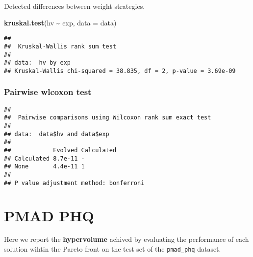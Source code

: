 \documentclass[
]{book}
\newenvironment{Shaded}{\begin{snugshade}}{\end{snugshade}}
\newcommand{\AttributeTok}[1]{\textcolor[rgb]{0.13,0.29,0.53}{#1}}
\newcommand{\ConstantTok}[1]{\textcolor[rgb]{0.56,0.35,0.01}{#1}}
\newcommand{\FunctionTok}[1]{\textcolor[rgb]{0.13,0.29,0.53}{\textbf{#1}}}
\newcommand{\NormalTok}[1]{#1}
\newcommand{\SpecialCharTok}[1]{\textcolor[rgb]{0.81,0.36,0.00}{\textbf{#1}}}
\newcommand{\StringTok}[1]{\textcolor[rgb]{0.31,0.60,0.02}{#1}}
\begin{document}
Detected differences between weight strategies.

\begin{Shaded}
\begin{Highlighting}[]
\FunctionTok{kruskal.test}\NormalTok{(hv }\SpecialCharTok{\textasciitilde{}}\NormalTok{ exp, }\AttributeTok{data =}\NormalTok{ data)}
\end{Highlighting}
\end{Shaded}

\begin{verbatim}
## 
##  Kruskal-Wallis rank sum test
## 
## data:  hv by exp
## Kruskal-Wallis chi-squared = 38.835, df = 2, p-value = 3.69e-09
\end{verbatim}

\hypertarget{pairwise-wlcoxon-test-11}{%
\subsection{Pairwise wlcoxon test}\label{pairwise-wlcoxon-test-11}}

\begin{Shaded}
\end{Shaded}

\begin{verbatim}
## 
##  Pairwise comparisons using Wilcoxon rank sum exact test 
## 
## data:  data$hv and data$exp 
## 
##            Evolved Calculated
## Calculated 8.7e-11 -         
## None       4.4e-11 1         
## 
## P value adjustment method: bonferroni
\end{verbatim}

\hypertarget{pmad-phq}{%
\chapter{PMAD PHQ}\label{pmad-phq}}

Here we report the \textbf{hypervolume} achived by evaluating the performance of each solution wihtin the Pareto front on the test set of the \texttt{pmad\_phq} dataset.
\end{document}
